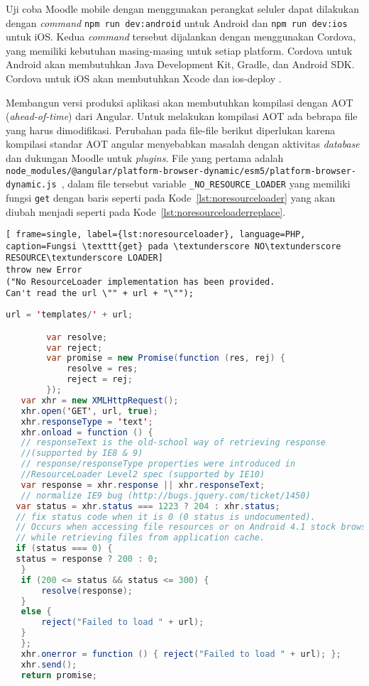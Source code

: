 Uji coba Moodle mobile dengan menggunakan perangkat seluler dapat dilakukan dengan \textit{command} \texttt{npm run dev:android} untuk Android dan \texttt{npm run dev:ios} untuk iOS. Kedua \textit{command} tersebut dijalankan dengan menggunakan Cordova, yang memiliki kebutuhan masing-masing untuk setiap platform. Cordova untuk Android akan membutuhkan Java Development Kit, Gradle, dan Android SDK\cite{cordova:android}. Cordova untuk iOS akan membutuhkan Xcode dan ios-deploy \cite{cordova:iOS}.

Membangun versi produksi aplikasi akan membutuhkan kompilasi dengan AOT (\textit{ahead-of-time}) dari Angular. Untuk melakukan kompilasi AOT ada bebrapa file yang harus dimodifikasi. Perubahan pada file-file berikut diperlukan karena kompilasi standar AOT angular menyebabkan masalah dengan aktivitas \textit{database} dan dukungan Moodle untuk \textit{plugins}.  File yang pertama adalah \texttt{node\_modules/@angular/platform-browser-dynamic/esm5/platform-browser-dynamic.js }, dalam file tersebut variable \texttt{\_NO\_RESOURCE\_LOADER} yang memiliki fungsi \texttt{get} dengan baris seperti pada \mbox{Kode \ref{lst:noresourceloader}} yang akan diubah menjadi seperti pada \mbox{Kode \ref{lst:noresourceloaderreplace}}.\cite{moodle:dev}

\begin{lstlisting}[ frame=single, label={lst:noresourceloader}, language=PHP, caption=Fungsi \texttt{get} pada \textunderscore NO\textunderscore RESOURCE\textunderscore LOADER]
throw new Error
("No ResourceLoader implementation has been provided. 
Can't read the url \"" + url + "\"");
\end{lstlisting}

\begin{lstlisting}[frame=single, label={lst:noresourceloaderreplace}, language=java, caption=Kode pengganti untuk fungsi \texttt{get}]
url = 'templates/' + url;

        var resolve;
        var reject;
        var promise = new Promise(function (res, rej) {
            resolve = res;
            reject = rej;
        });
   var xhr = new XMLHttpRequest();
   xhr.open('GET', url, true);
   xhr.responseType = 'text';
   xhr.onload = function () {
   // responseText is the old-school way of retrieving response 
   //(supported by IE8 & 9)
   // response/responseType properties were introduced in 
   //ResourceLoader Level2 spec (supported by IE10)
   var response = xhr.response || xhr.responseText;
   // normalize IE9 bug (http://bugs.jquery.com/ticket/1450)
  var status = xhr.status === 1223 ? 204 : xhr.status;
  // fix status code when it is 0 (0 status is undocumented).
  // Occurs when accessing file resources or on Android 4.1 stock browser
  // while retrieving files from application cache.
  if (status === 0) {
  status = response ? 200 : 0;
   }
   if (200 <= status && status <= 300) {
       resolve(response);
   }
   else {
       reject("Failed to load " + url);
   }
   };
   xhr.onerror = function () { reject("Failed to load " + url); };
   xhr.send();
   return promise;
\end{lstlisting}

